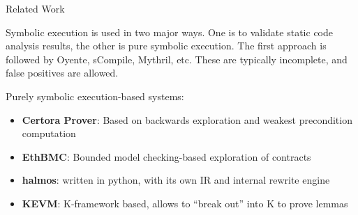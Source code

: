 \documentclass[aspectratio=169]{beamer}
\begin{document}
\begin{frame}{Related Work}

Symbolic execution is used in two major ways. One is to validate static code analysis results, the other is pure symbolic execution. The first approach is followed by Oyente, sCompile, Mythril, etc. These are typically incomplete, and false positives are allowed.

\bigskip

Purely symbolic execution-based systems:
\begin{itemize}
\item \textbf{Certora Prover}: Based on backwards exploration and weakest precondition computation
\item \textbf{EthBMC}: Bounded model checking-based exploration of contracts
\item \textbf{halmos}: written in python, with its own IR and internal rewrite engine
\item \textbf{KEVM}: K-framework based, allows to ``break out'' into K to prove lemmas
\end{itemize}

\end{frame}

%
%
%
%
\end{document}
